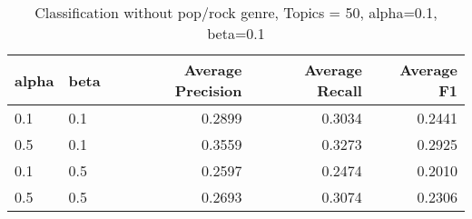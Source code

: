 \begin{table}[h]
\begin{tabular}{|l|l|r|r|r|}

\hline
\textbf{alpha} & \textbf{beta} &  \textbf{Average Precision} & \textbf{Average Recall} & \textbf{Average F1} \\
\hline
0.1 & 0.1 & 0.2899 	&0.3034 &	0.2441\\
0.5 & 0.1 & 0.3559	& 0.3273	& 0.2925\\
0.1 & 0.5 & 0.2597 & 	0.2474 & 	0.2010\\
0.5 & 0.5	&	0.2693 &	0.3074 &	0.2306\\
\hline
\end{tabular}
\caption{Classification without pop/rock genre, Topics = 50, alpha=0.1, beta=0.1}
\end{table}